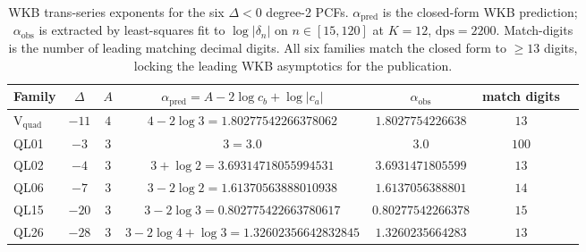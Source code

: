 \begin{table}[ht]
\centering
\small
\begin{tabular}{lcccccr}
\toprule
Family & $\Delta$ & $A$ & $\alpha_{\mathrm{pred}}=A-2\log c_{b}+\log|c_{a}|$ & $\alpha_{\mathrm{obs}}$ & match digits \\
\midrule
$\mathrm{V_{quad}}$ & $-11$ & $4$ & $4-2\log 3 = 1.80277542266378062$ & $1.8027754226638$ & $13$ \\
QL01 & $-3$ & $3$ & $3 = 3.0$ & $3.0$ & $100$ \\
QL02 & $-4$ & $3$ & $3 + \log 2 = 3.69314718055994531$ & $3.6931471805599$ & $13$ \\
QL06 & $-7$ & $3$ & $3-2\log 2 = 1.61370563888010938$ & $1.6137056388801$ & $14$ \\
QL15 & $-20$ & $3$ & $3-2\log 3 = 0.802775422663780617$ & $0.80277542266378$ & $15$ \\
QL26 & $-28$ & $3$ & $3-2\log 4 + \log 3 = 1.32602356642832845$ & $1.3260235664283$ & $13$ \\
\bottomrule
\end{tabular}
\caption{WKB trans-series exponents for the six $\Delta<0$ degree-2 PCFs. $\alpha_{\mathrm{pred}}$ is the closed-form WKB prediction; $\alpha_{\mathrm{obs}}$ is extracted by least-squares fit to $\log|\delta_{n}|$ on $n\in[15,120]$ at $K=12$, $\mathrm{dps}=2200$. Match-digits is the number of leading matching decimal digits. All six families match the closed form to $\geq 13$ digits, locking the leading WKB asymptotics for the publication.}
\label{tab:wkb-exponents}
\end{table}
